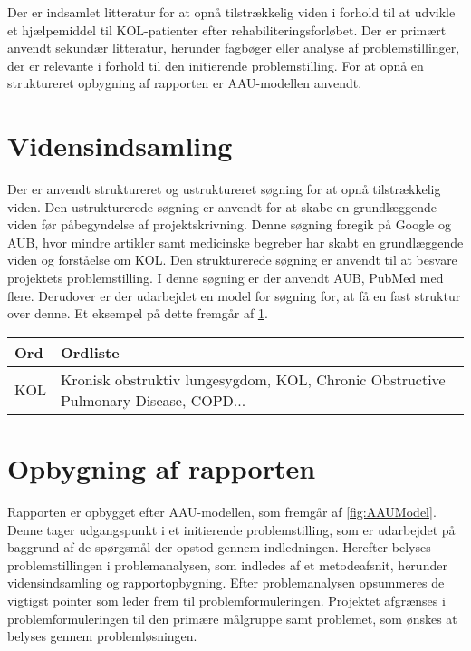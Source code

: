 Der er indsamlet litteratur for at opnå tilstrækkelig viden i forhold til at udvikle et hjælpemiddel til KOL-patienter efter rehabiliteringsforløbet. Der er primært anvendt sekundær litteratur, herunder fagbøger eller analyse af problemstillinger, der er relevante i forhold til den initierende problemstilling. For at opnå en struktureret opbygning af rapporten er AAU-modellen anvendt. 

\section{Vidensindsamling}
Der er anvendt struktureret og ustruktureret søgning for at opnå tilstrækkelig viden. Den ustrukturerede søgning er anvendt for at skabe en grundlæggende viden før påbegyndelse af projektskrivning. Denne søgning foregik på Google og AUB, hvor mindre artikler samt medicinske begreber har skabt en grundlæggende viden og forståelse om KOL. Den strukturerede søgning er anvendt til at besvare projektets problemstilling. I denne søgning er der anvendt AUB, PubMed med flere. Derudover er der udarbejdet en model for søgning for, at få en fast struktur over denne. Et eksempel på dette fremgår af \ref{tab:viden}. 

\begin{table}[H]
\centering
\label{tab:viden}
\begin{tabular}{|l|l|}
\hline
Ord & Ordliste                                 \\ \hline
KOL & Kronisk obstruktiv lungesygdom, KOL, Chronic Obstructive Pulmonary Disease, COPD... \\ \hline
\end{tabular}
\end{table}

\section{Opbygning af rapporten}
Rapporten er opbygget efter AAU-modellen, som fremgår af \ref{fig:AAUModel}. Denne tager udgangspunkt i et initierende problemstilling, som er udarbejdet på baggrund af de spørgsmål der opstod gennem indledningen. Herefter belyses problemstillingen i problemanalysen, som indledes af et metodeafsnit, herunder vidensindsamling og rapportopbygning. Efter problemanalysen opsummeres de vigtigst pointer som leder frem til problemformuleringen. Projektet afgrænses i problemformuleringen til den primære målgruppe samt problemet, som ønskes at belyses gennem problemløsningen. 

